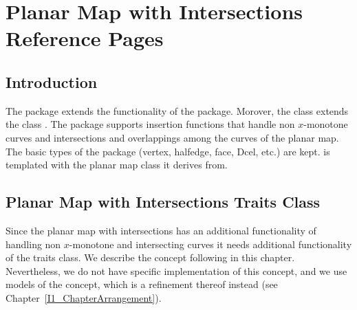 


\clearpage
\section{Planar Map with Intersections Reference Pages}

\subsection*{Introduction}

  The  package extends the
  functionality of the  package. Morover, the class
   extends the class
  . The  package
  supports insertion functions that handle non $x$-monotone curves and
  intersections and overlappings among the curves of the planar
  map. The basic types of the  package (vertex,
  halfedge, face, Dcel, etc.) are
  kept.  is templated with the
  planar map class it derives from.

\subsection*{Planar Map with Intersections Traits Class}
  Since the planar map with intersections has an additional
  functionality of handling non $x$-monotone and intersecting curves
  it needs additional functionality of the traits class. We describe
  the  concept following in
  this chapter. Nevertheless, we do not have specific implementation
  of this concept, and we use models of the 
  concept, which is a refinement thereof instead (see
  Chapter~\ref{I1_ChapterArrangement}).

